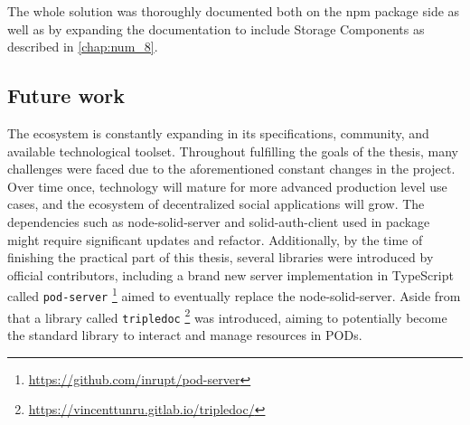 The whole \lpas{} solution was thoroughly documented both on the npm package side as well as by expanding the \lpa{} documentation to include Storage Components as described in \autoref{chap:num_8}.

\subsection{Future work}

The \solid{} ecosystem is constantly expanding in its specifications, community, and available technological toolset. Throughout fulfilling the goals of the thesis, many challenges were faced due to the aforementioned constant changes in the \solid{} project. Over time once, \solid{} technology will mature for more advanced production level use cases, and the ecosystem of decentralized social applications will grow. The dependencies such as node-solid-server and solid-auth-client used in \lpas{} package might require significant updates and refactor. Additionally, by the time of finishing the practical part of this thesis, several libraries were introduced by official \solid{} contributors, including a brand new \solid{} server implementation in TypeScript called \texttt{pod-server} \footnote{\url{https://github.com/inrupt/pod-server}} aimed to eventually replace the node-solid-server. Aside from that a library called \texttt{tripledoc} \footnote{\url{https://vincenttunru.gitlab.io/tripledoc/}} was introduced, aiming to potentially become the standard library to interact and manage resources in \solid{} PODs. 

